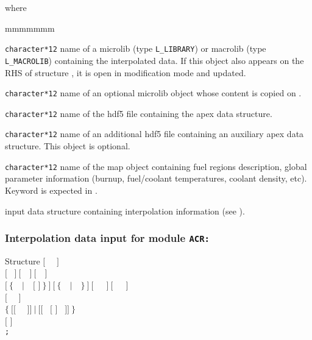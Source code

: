 \noindent where
\begin{ListeDeDescription}{mmmmmmm}

\item[\dusa{MLIB}] {\tt character*12} name of a {\sc microlib} (type {\tt L\_LIBRARY}) or {\sc macrolib} (type {\tt L\_MACROLIB}) containing the interpolated data.
If this object also appears on the RHS of structure , it is open in modification mode and updated.

\item[\dusa{MLIB2}] {\tt character*12} name of an optional {\sc microlib} object whose content is copied on .

\item[\dusa{APXNAM1}] {\tt character*12} name of the {\sc hdf5} file containing the {\sc apex} data structure.

\item[\dusa{APXNAM2}] {\tt character*12} name of an additional {\sc hdf5} file containing an auxiliary
{\sc apex} data structure. This object is optional.

\item[\dusa{MAPFL}] {\tt character*12} name of the {\sc map} object containing fuel regions description, global parameter
information (burnup, fuel/coolant temperatures, coolant density, etc). Keyword  is expected in .

\item[\dusa{acr\_data}] input data structure containing interpolation information (see ).

\end{ListeDeDescription}

\subsubsection{Interpolation data input for module {\tt ACR:}}\label{sect:descacr}

\vskip -0.5cm

\begin{DataStructure}{Structure }
$[$~ ~$]$ \\
$[$~ $]~[$~~$]~[$~~$]$ \\
$[~\{$~~$|$~~$[$  $]~\}~]~[~\{$~~$|$~~$\}~]~[$~~~$]~[$~~~$]$ \\
$[$~ ~$]$ \\
$\{~[[$~  ~$]]~|~[[$~  $[$  $]$  ~$]]~\}$ \\
$[$  $]$ \\
{\tt ;}
\end{DataStructure}

